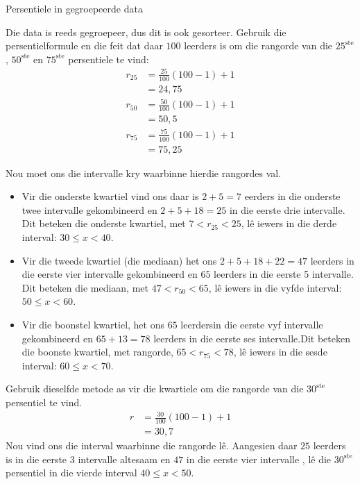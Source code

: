 \begin{wex}{Persentiele in gegroepeerde data}
{  

  Die data is reeds gegroepeer, dus dit is ook gesorteer. Gebruik die persentielformule en die feit dat daar
  $100$ leerders is om die rangorde van die $25^{\mathrm{ste}}$, $50^{\mathrm{ste}}$ en
  $75^{\mathrm{ste}}$ persentiele te vind:
  \begin{align*}
    r_{25} &= \frac{25}{100}\left(100-1\right)+1 \\
          &= 24,75 \\
    r_{50} &= \frac{50}{100}\left(100-1\right)+1 \\
          &= 50,5 \\
    r_{75} &= \frac{75}{100}\left(100-1\right)+1 \\
          &= 75,25
  \end{align*}

  Nou moet ons die intervalle kry waarbinne hierdie rangordes val.
  \begin{itemize}
  \item Vir die onderste kwartiel vind ons daar is $2 + 5 = 7$
    eerders in die onderste twee intervalle gekombineerd en $2 + 5 + 18 = 25$
    in die eerste drie intervalle. Dit beteken die onderste kwartiel, met
    $7 < r_{25} < 25$,
    lê iewers in die derde interval: $30 \leq x < 40$.
  \item Vir die tweede kwartiel (die mediaan) het ons
    $2 + 5 + 18 + 22 = 47$ leerders in die eerste vier intervalle gekombineerd en $65$ leerders in die eerste 5 intervalle. Dit beteken die mediaan, met $47 < r_{50} < 65$,
    l\^e iewers in die vyfde interval: $50 \leq x < 60$.
  \item Vir die boonstel kwartiel, het ons $65$ leerdersin die eerste vyf intervalle gekombineerd en  $65 + 13 = 78$ 
    leerders in die eerste ses intervalle.Dit beteken die boonste kwartiel, met rangorde,
    $65 < r_{75} < 78$,
    l\^e iewers in die sesde interval: $60 \leq x < 70$.
  \end{itemize}


  Gebruik dieselfde metode as vir die kwartiele om die rangorde van die $30^{\mathrm{ste}}$ persentiel te vind.
  \begin{align*}
    r &= \frac{30}{100}\left(100-1\right)+1 \\
      &= 30,7
  \end{align*}
  Nou vind ons die interval waarbinne die rangorde l\^e. Aangesien daar $25$ leerders is in die eerste $3$ intervalle altesaam en $47$
  in die eerste vier intervalle , l\^e die $30^{\mathrm{ste}}$ persentiel in die vierde interval $40 \leq x < 50$.
}
\end{wex}


